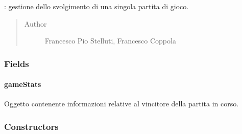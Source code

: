 \documentclass[letterpaper,10pt,italian,openany,oneside]{sphinxmanual}
\begin{document}
\begin{fulllineitems}
\label{\detokenize{source/it/unicam/cs/pa/mastermind/gamecore/SingleMatch:it.unicam.cs.pa.mastermind.gamecore.SingleMatch}}
: gestione dello svolgimento di una singola partita di gioco.
\begin{quote}\begin{description}
\item[{Author}] \leavevmode
Francesco Pio Stelluti, Francesco Coppola

\end{description}\end{quote}

\end{fulllineitems}



\subsubsection{Fields}
\label{\detokenize{source/it/unicam/cs/pa/mastermind/gamecore/SingleMatch:fields}}

\paragraph{gameStats}
\label{\detokenize{source/it/unicam/cs/pa/mastermind/gamecore/SingleMatch:gamestats}}

\begin{fulllineitems}
\label{\detokenize{source/it/unicam/cs/pa/mastermind/gamecore/SingleMatch:it.unicam.cs.pa.mastermind.gamecore.SingleMatch.gameStats}}
Oggetto contenente informazioni relative al vincitore della partita in corso.

\end{fulllineitems}



\subsubsection{Constructors}
\label{\detokenize{source/it/unicam/cs/pa/mastermind/gamecore/SingleMatch:constructors}}
\end{document}
